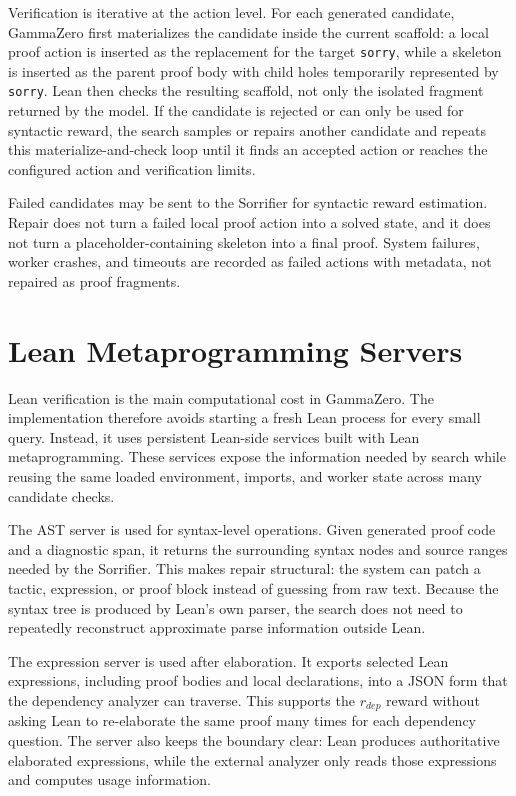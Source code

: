 \documentclass[en]{uet_awesome_thesis/uet-awesome-thesis}
\begin{document}
Verification is iterative at the action level. For each generated candidate, GammaZero first materializes the candidate inside the current scaffold: a local proof action is inserted as the replacement for the target \texttt{sorry}, while a skeleton is inserted as the parent proof body with child holes temporarily represented by \texttt{sorry}. Lean then checks the resulting scaffold, not only the isolated fragment returned by the model. If the candidate is rejected or can only be used for syntactic reward, the search samples or repairs another candidate and repeats this materialize-and-check loop until it finds an accepted action or reaches the configured action and verification limits.

Failed candidates may be sent to the Sorrifier for syntactic reward estimation. Repair does not turn a failed local proof action into a solved state, and it does not turn a placeholder-containing skeleton into a final proof. System failures, worker crashes, and timeouts are recorded as failed actions with metadata, not repaired as proof fragments.

\section{Lean Metaprogramming Servers}

Lean verification is the main computational cost in GammaZero. The implementation therefore avoids
starting a fresh Lean process for every small query. Instead, it uses persistent Lean-side services built
with Lean metaprogramming. These services expose the information needed by search while reusing the
same loaded environment, imports, and worker state across many candidate checks.

The AST server is used for syntax-level operations. Given generated proof code and a diagnostic span, it
returns the surrounding syntax nodes and source ranges needed by the Sorrifier. This makes repair
structural: the system can patch a tactic, expression, or proof block instead of guessing from raw text.
Because the syntax tree is produced by Lean's own parser, the search does not need to repeatedly
reconstruct approximate parse information outside Lean.

The expression server is used after elaboration. It exports selected Lean expressions, including proof
bodies and local declarations, into a JSON form that the dependency analyzer can traverse. This supports
the \(r_{dep}\) reward without asking Lean to re-elaborate the same proof many times for each dependency
question. The server also keeps the boundary clear: Lean produces authoritative elaborated expressions,
while the external analyzer only reads those expressions and computes usage information.
\end{document}
